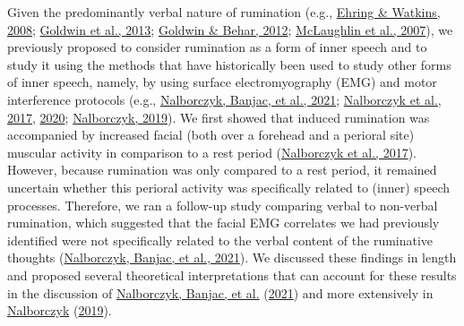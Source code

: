 \documentclass[
  english,
  man, donotrepeattitle,mask,floatsintext]{apa6}
\begin{document}
Given the predominantly verbal nature of rumination (e.g., \protect\hyperlink{ref-ehring_repetitive_2008}{Ehring \& Watkins, 2008}; \protect\hyperlink{ref-goldwin_concreteness_2013}{Goldwin et al., 2013}; \protect\hyperlink{ref-goldwin_concreteness_2012}{Goldwin \& Behar, 2012}; \protect\hyperlink{ref-mclaughlin_effects_2007}{McLaughlin et al., 2007}), we previously proposed to consider rumination as a form of inner speech and to study it using the methods that have historically been used to study other forms of inner speech, namely, by using surface electromyography (EMG) and motor interference protocols (e.g., \protect\hyperlink{ref-nalborczyk_dissociating_2021}{Nalborczyk, Banjac, et al., 2021}; \protect\hyperlink{ref-nalborczyk_orofacial_2017}{Nalborczyk et al., 2017}, \protect\hyperlink{ref-nalborczyk_articulatory_2020}{2020}; \protect\hyperlink{ref-nalborczyk_understanding_2019}{Nalborczyk, 2019}). We first showed that induced rumination was accompanied by increased facial (both over a forehead and a perioral site) muscular activity in comparison to a rest period (\protect\hyperlink{ref-nalborczyk_orofacial_2017}{Nalborczyk et al., 2017}). However, because rumination was only compared to a rest period, it remained uncertain whether this perioral activity was specifically related to (inner) speech processes. Therefore, we ran a follow-up study comparing verbal to non-verbal rumination, which suggested that the facial EMG correlates we had previously identified were not specifically related to the verbal content of the ruminative thoughts (\protect\hyperlink{ref-nalborczyk_dissociating_2021}{Nalborczyk, Banjac, et al., 2021}). We discussed these findings in length and proposed several theoretical interpretations that can account for these results in the discussion of \protect\hyperlink{ref-nalborczyk_dissociating_2021}{Nalborczyk, Banjac, et al.} (\protect\hyperlink{ref-nalborczyk_dissociating_2021}{2021}) and more extensively in \protect\hyperlink{ref-nalborczyk_understanding_2019}{Nalborczyk} (\protect\hyperlink{ref-nalborczyk_understanding_2019}{2019}).
\end{document}
